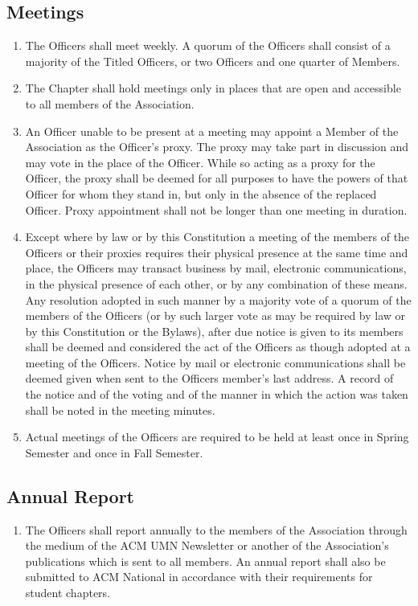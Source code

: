 \documentclass[12pt,letterpaper]{article}
\begin{document}
\subsection{Meetings}
\begin{enumerate}
	\item The Officers shall meet weekly. A quorum of the Officers shall consist of a
				majority of the Titled Officers, or two Officers and one quarter of Members.
	\item The Chapter shall hold meetings only in places that are open and accessible
				to all members of the Association.
	\item An Officer unable to be present at a meeting may appoint a Member of the
				Association as the Officer’s proxy. The proxy may take part in discussion and
				may vote in the place of the Officer. While so acting as a proxy for the
				Officer, the proxy shall be deemed for all purposes to have the powers of
				that Officer for whom they stand in, but only in the absence of the replaced
				Officer. Proxy appointment shall not be longer than one meeting in duration.
	\item Except where by law or by this Constitution a meeting of the members of the
				Officers or their proxies requires their physical presence at the same time
				and place, the Officers may transact business by mail, electronic
				communications, in the physical presence of each other, or by any combination
				of these means. Any resolution adopted in such manner by a majority vote of a
				quorum of the members of the Officers (or by such larger vote as may be
				required by law or by this Constitution or the Bylaws), after due notice is
				given to its members shall be deemed and considered the act of the Officers
				as though adopted at a meeting of the Officers. Notice by mail or electronic
				communications shall be deemed given when sent to the Officers member's last
				address. A record of the notice and of the voting and of the manner in which
				the action was taken shall be noted in the meeting minutes.
	\item Actual meetings of the Officers are required to be held at least once in
				Spring Semester and once in Fall Semester.
\end{enumerate}

\subsection{Annual Report}
\begin{enumerate}
	\item The Officers shall report annually to the members of the Association through
				the medium of the ACM UMN Newsletter or another of the Association's
				publications which is sent to all members. An annual report shall also be
				submitted to ACM National in accordance with their requirements for student
				chapters.
\end{enumerate}
\end{document}
